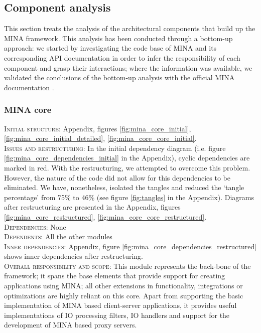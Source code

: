 \subsection{Component analysis}
\label{sec:component_analysis}
This section treats the analysis of the architectural components that build up the MINA framework. This analysis has been conducted through a bottom-up approach: we started by investigating the code base of MINA \cite{mina-github} and its corresponding API documentation \cite{mina-reference} in order to infer the responsibility of each component and grasp their interactions; where the information was available, we validated the conclusions of the bottom-up analysis with the official MINA documentation \cite{mina-docs}. 
\subsubsection{MINA core}
\textsc{Initial structure}: Appendix, figures \ref{fig:mina_core_initial}, \ref{fig:mina_core_initial_detailed}, \ref{fig:mina_core_core_initial}.  \\
\textsc{Issues and restructuring}: In the initial dependency diagram (i.e. figure \ref{fig:mina_core_dependencies_initial} in the Appendix), cyclic dependencies are marked in red. With the restructuring, we attempted to overcome this problem. However, the nature of the code did not allow for this dependencies to be eliminated. We have, nonetheless, isolated the tangles and reduced the `tangle percentage' from 75\% to 46\% (see figure \ref{fig:tangles} in the Appendix). Diagrams after restructuring are presented in the Appendix, figures \ref{fig:mina_core_restructured}, \ref{fig:mina_core_core_restructured}.\\
\textsc{Dependencies}: None \\
\textsc{Dependents}: All the other modules\\
\textsc{Inner dependencies}: Appendix, figure \ref{fig:mina_core_dependencies_restructured} shows inner dependencies after restructuring.\\
\textsc{Overall responsibility and scope}: This module represents the back-bone of the framework; it spans the base elements that provide support for creating applications using MINA; all other extensions in functionality, integrations or optimizations are highly reliant on this core. Apart from supporting the basic implementation of MINA based client-server applications, it provides useful implementations of IO processing filters, IO handlers and support for the development of MINA based proxy servers.\\
